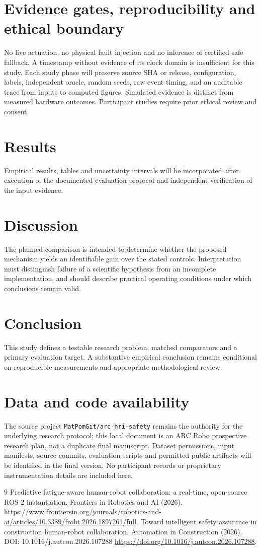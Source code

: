 \documentclass[11pt,a4paper]{article}
\begin{document}
\section{Evidence gates, reproducibility and ethical boundary}
No live actuation, no physical fault injection and no inference of certified safe fallback. A timestamp without evidence of its clock domain is insufficient for this study. Each study phase will preserve source SHA or release, configuration, labels, independent oracle, random seeds, raw event timing, and an auditable trace from inputs to computed figures. Simulated evidence is distinct from measured hardware outcomes. Participant studies require prior ethical review and consent.

\section{Results}
Empirical results, tables and uncertainty intervals will be incorporated after execution of the documented evaluation protocol and independent verification of the input evidence.

\section{Discussion}
The planned comparison is intended to determine whether the proposed mechanism yields an identifiable gain over the stated controls. Interpretation must distinguish failure of a scientific hypothesis from an incomplete implementation, and should describe practical operating conditions under which conclusions remain valid.

\section{Conclusion}
This study defines a testable research problem, matched comparators and a primary evaluation target. A substantive empirical conclusion remains conditional on reproducible measurements and appropriate methodological review.

\section{Data and code availability}
The source project \texttt{MatPomGit/arc-hri-safety} remains the authority for the underlying research protocol; this local document is an ARC Robo prospective research plan, not a duplicate final manuscript. Dataset permissions, input manifests, source commits, evaluation scripts and permitted public artifacts will be identified in the final version. No participant records or proprietary instrumentation details are included here.
\begin{thebibliography}{9}
 Predictive fatigue-aware human-robot collaboration: a real-time, open-source ROS 2 instantiation. Frontiers in Robotics and AI (2026). \url{https://www.frontiersin.org/journals/robotics-and-ai/articles/10.3389/frobt.2026.1897261/full}.
 Toward intelligent safety assurance in construction human-robot collaboration. Automation in Construction (2026). DOI: 10.1016/j.autcon.2026.107288 \url{https://doi.org/10.1016/j.autcon.2026.107288}.
\end{thebibliography}
\end{document}
